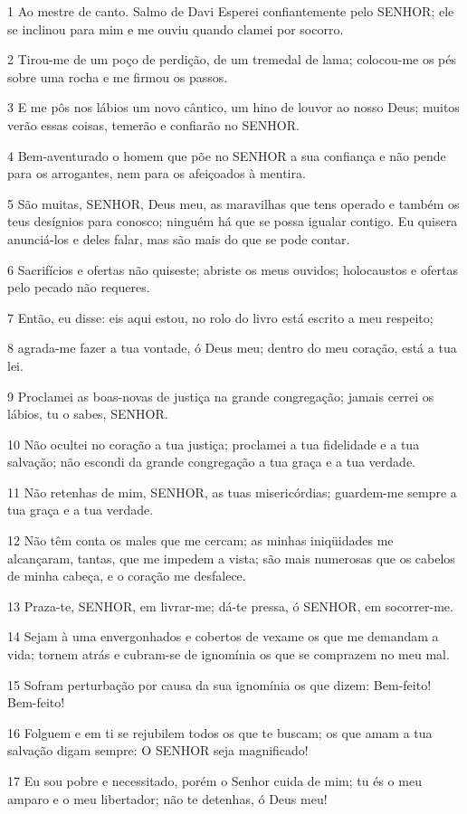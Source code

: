 \par 1 Ao mestre de canto. Salmo de Davi Esperei confiantemente pelo SENHOR; ele se inclinou para mim e me ouviu quando clamei por socorro.
\par 2 Tirou-me de um poço de perdição, de um tremedal de lama; colocou-me os pés sobre uma rocha e me firmou os passos.
\par 3 E me pôs nos lábios um novo cântico, um hino de louvor ao nosso Deus; muitos verão essas coisas, temerão e confiarão no SENHOR.
\par 4 Bem-aventurado o homem que põe no SENHOR a sua confiança e não pende para os arrogantes, nem para os afeiçoados à mentira.
\par 5 São muitas, SENHOR, Deus meu, as maravilhas que tens operado e também os teus desígnios para conosco; ninguém há que se possa igualar contigo. Eu quisera anunciá-los e deles falar, mas são mais do que se pode contar.
\par 6 Sacrifícios e ofertas não quiseste; abriste os meus ouvidos; holocaustos e ofertas pelo pecado não requeres.
\par 7 Então, eu disse: eis aqui estou, no rolo do livro está escrito a meu respeito;
\par 8 agrada-me fazer a tua vontade, ó Deus meu; dentro do meu coração, está a tua lei.
\par 9 Proclamei as boas-novas de justiça na grande congregação; jamais cerrei os lábios, tu o sabes, SENHOR.
\par 10 Não ocultei no coração a tua justiça; proclamei a tua fidelidade e a tua salvação; não escondi da grande congregação a tua graça e a tua verdade.
\par 11 Não retenhas de mim, SENHOR, as tuas misericórdias; guardem-me sempre a tua graça e a tua verdade.
\par 12 Não têm conta os males que me cercam; as minhas iniqüidades me alcançaram, tantas, que me impedem a vista; são mais numerosas que os cabelos de minha cabeça, e o coração me desfalece.
\par 13 Praza-te, SENHOR, em livrar-me; dá-te pressa, ó SENHOR, em socorrer-me.
\par 14 Sejam à uma envergonhados e cobertos de vexame os que me demandam a vida; tornem atrás e cubram-se de ignomínia os que se comprazem no meu mal.
\par 15 Sofram perturbação por causa da sua ignomínia os que dizem: Bem-feito! Bem-feito!
\par 16 Folguem e em ti se rejubilem todos os que te buscam; os que amam a tua salvação digam sempre: O SENHOR seja magnificado!
\par 17 Eu sou pobre e necessitado, porém o Senhor cuida de mim; tu és o meu amparo e o meu libertador; não te detenhas, ó Deus meu!

